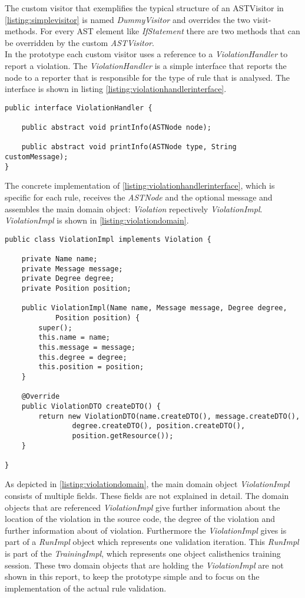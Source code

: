 The custom visitor that exemplifies the typical structure of an \acf{ASTVisitor} in \ref{listing:simplevisitor} is named \textit{DummyVisitor} and overrides the two visit-methods.
For every \acf{AST} element like \textit{IfStatement} there are two methods that can be overridden by the custom \textit{ASTVisitor}. 
\\

In the prototype each custom visitor uses a reference to a \textit{ViolationHandler} to report a violation. The \textit{ViolationHandler} is a simple interface that reports the node to a reporter that is responsible for the type of rule that is analysed. The interface is shown in listing \ref{listing:violationhandlerinterface}. 

\begin{lstlisting}
public interface ViolationHandler {

	public abstract void printInfo(ASTNode node);

	public abstract void printInfo(ASTNode type, String customMessage);
}
\end{lstlisting}
\label{listing:violationhandlerinterface}

The concrete implementation of \ref{listing:violationhandlerinterface}, which is specific for each rule, receives the \textit{ASTNode} and the optional message and assembles the main domain object: \textit{Violation} repectively \textit{ViolationImpl}. \textit{ViolationImpl} is shown in \ref{listing:violationdomain}.

\begin{lstlisting}
public class ViolationImpl implements Violation {

	private Name name;
	private Message message;
	private Degree degree;
	private Position position;

	public ViolationImpl(Name name, Message message, Degree degree,
			Position position) {
		super();
		this.name = name;
		this.message = message;
		this.degree = degree;
		this.position = position;
	}

	@Override
	public ViolationDTO createDTO() {
		return new ViolationDTO(name.createDTO(), message.createDTO(),
				degree.createDTO(), position.createDTO(),
				position.getResource());
	}

}
\end{lstlisting}
\label{listing:violationdomain}

As depicted in \ref{listing:violationdomain}, the main domain object \textit{ViolationImpl} consists of multiple fields. These fields are not explained in detail. The domain objects that are referenced \textit{ViolationImpl} give further information about the location of the violation in the source code, the degree of the violation and further information about of violation. Furthermore the \textit{ViolationImpl} gives is part of a \textit{RunImpl} object which represents one validation iteration. This \textit{RunImpl} is part of the \textit{TrainingImpl}, which represents one object calisthenics training session. These two domain objects that are holding the \textit{ViolationImpl} are not shown in this report, to keep the prototype simple and to focus on the implementation of the actual rule validation. 
\\

